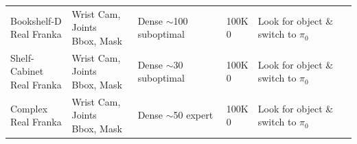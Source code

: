 \documentclass[11pt]{article}
\begin{document}
\begin{table}[htbp]
{\begin{tabular}{lllll}
\addlinespace
\makecell{Bookshelf-D \\ Real Franka} & \makecell{Wrist Cam, Joints \\ Bbox, Mask} & \makecell{Dense \\ $\sim$100 suboptimal} & \makecell{100K \\ 0} & \makecell{Look for object \&\\switch to $\pi_0$} \\
\addlinespace
\makecell{Shelf-Cabinet \\ Real Franka} & \makecell{Wrist Cam, Joints \\ Bbox, Mask} & \makecell{Dense \\ $\sim$30 suboptimal} & \makecell{100K \\ 0} & \makecell{Look for object \&\\switch to $\pi_0$} \\
\addlinespace
\makecell{Complex \\ Real Franka} & \makecell{Wrist Cam, Joints \\ Bbox, Mask} & \makecell{Dense \\ $\sim$50 expert} & \makecell{100K \\ 0} & \makecell{Look for object \&\\switch to $\pi_0$} \\
%
%
\bottomrule
\end{tabular}
}
\end{table}
\end{document}
